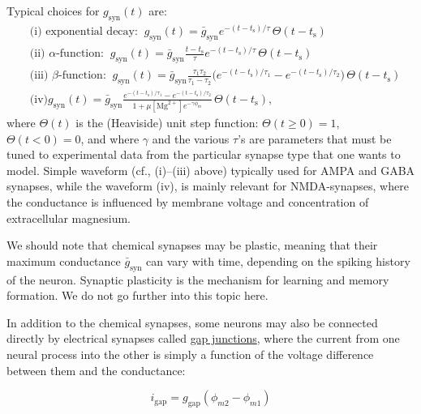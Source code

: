 Typical choices for $g_\text{syn}(t)$ are: 
\begin{align}
&\text{(i) exponential decay:} \;\; g_\text{syn}(t) = \bar{g}_\text{syn} e^{-(t-t_\text{s})/\tau}\, \Theta(t-t_\text{s}) \\
&\text{(ii) $\alpha$-function:} \;\; g_\text{syn}(t) = \bar{g}_\text{syn} \frac{t-t_\text{s}}{\tau} e^{-(t-t_\text{s})/\tau} \, \Theta(t-t_\text{s}) \\
&\text{(iii) $\beta$-function:} \;\; g_\text{syn}(t) = \bar{g}_\text{syn} \frac{\tau_1 \tau_2}{\tau_1-\tau_2} 
\Big( e^{-(t-t_\text{s})/\tau_1} - e^{-(t-t_\text{s})/\tau_2} \Big) \, \Theta(t-t_\text{s}) \\
& \text{(iv)} g_\text{syn}(t) = \bar{g}_\text{syn} \frac{e^{-(t-t_\text{s})/\tau_1} - e^{-(t-t_\text{s})/\tau_2}} {1+\mu [\text{Mg}^{2+}] e^{-\gamma \phi_m} } \, \Theta(t-t_\text{s}),
\label{Neuron:eq:synapseforms}
\end{align}
where $\Theta(t)$ is the (Heaviside) unit step function: $\Theta(t \ge 0)=1$,  $\Theta(t< 0)=0$, and where $\gamma$ and the various $\tau$'s are parameters that must be tuned to experimental data from the particular synapse type that one wants to model. 
Simple waveform (cf., (i)--(iii) above) typically used for AMPA  and GABA synapses, while the waveform (iv), is mainly relevant for NMDA-synapses, where the conductance is influenced by membrane voltage and concentration of extracellular magnesium. 

We should note that chemical synapses may be plastic, meaning that their maximum conductance $\bar{g}_\text{syn}$ can vary with time, depending on the spiking history of the neuron. Synaptic plasticity is the mechanism for learning and memory formation. We do not go further into this topic here. 

In addition to the chemical synapses, some neurons may also be connected directly by electrical synapses called \underline{gap junctions}, where the current from one neural process into the other is simply a function of the voltage difference between them and the conductance: 

\begin{equation}
i_\text{gap}=g_\text{gap} (\phi_{m2}-\phi_{m1})
\label{Neuron:eq:gapjunction}
\end{equation}



